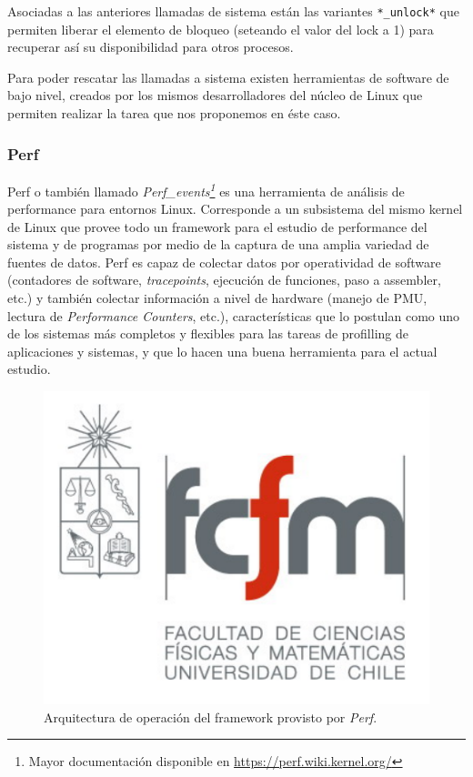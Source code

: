 Asociadas a las anteriores llamadas de sistema están las variantes \verb=*_unlock*= que permiten liberar el elemento de bloqueo (seteando el valor del lock a 1) para recuperar así su disponibilidad para otros procesos.

Para poder rescatar las llamadas a sistema existen herramientas de software de bajo nivel, creados por los mismos desarrolladores del núcleo de Linux que permiten realizar la tarea que nos proponemos en éste caso.

\subsubsection{Perf}
Perf \cite{slides:perfTools} o también llamado \emph{Perf\_events\footnote{Mayor documentación disponible en \url{https://perf.wiki.kernel.org/}}} es una herramienta de análisis de performance para entornos Linux. Corresponde a un subsistema del mismo kernel de Linux que provee todo un framework para el estudio de performance del sistema y de programas por medio de la captura de una amplia variedad de fuentes de datos. Perf es capaz de colectar datos por operatividad de software (contadores de software, \emph{tracepoints}, ejecución de funciones, paso a assembler, etc.) y también colectar información a nivel de hardware (manejo de PMU, lectura de \emph{Performance Counters}, etc.), características que lo postulan como uno de los sistemas más completos y flexibles para las tareas de profilling de aplicaciones y sistemas, y que lo hacen una buena herramienta para el actual estudio.

\begin{figure}[!h]
	\centering
	\includegraphics[scale=.3]{imagenes/fcfm}
	\caption{Arquitectura de operación del framework provisto por \emph{Perf}.}
	\label{fig:perfFramework}
\end{figure}

